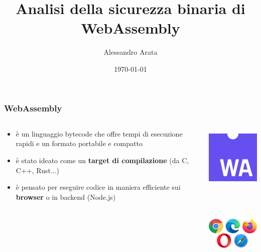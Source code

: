 \documentclass{beamer}
\begin{document}
\title[Sicurezza binaria di WebAssembly]{Analisi della sicurezza binaria di WebAssembly}
\author{Alessandro Arata}
\date{\today}

\begin{frame}
  \titlepage
\end{frame}

\begin{frame}
  \frametitle{WebAssembly}
  \begin{columns}
    \begin{column}{0.6\textwidth}
      \begin{itemize}
        \item è un linguaggio bytecode che offre tempi di esecuzione rapidi e un
        formato portabile e compatto
      \pause
      \item è stato ideato come un \textbf{target di compilazione} (da C, C++,
        Rust...)
      \pause
      \item è pensato per eseguire codice in maniera efficiente sui \textbf{browser} o in backend (Node.js) 
      \end{itemize}
    \end{column}
    \begin{column}{0.4\textwidth}
      \centerline{\includegraphics[width=3cm,height=3cm,keepaspectratio]{images/logo.png}}
      \newline\newline\newline
      \centerline{\includegraphics[width=4cm,height=4cm,keepaspectratio]{images/browser-logos.png}}
    \end{column}
  \end{columns}
\end{frame}
\end{document}
